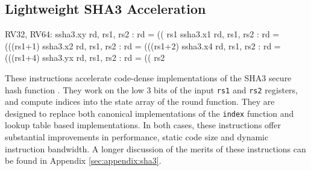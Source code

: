 

\subsection{Lightweight SHA3 Acceleration}
\label{sec:scalar:sha3}

\begin{cryptoisa}
RV32, RV64:
    ssha3.xy rd, rs1, rs2 : rd = (( rs1    %
    ssha3.x1 rd, rs1, rs2 : rd = (((rs1+1) %
    ssha3.x2 rd, rs1, rs2 : rd = (((rs1+2) %
    ssha3.x4 rd, rs1, rs2 : rd = (((rs1+4) %
    ssha3.yx rd, rs1, rs2 : rd = (( rs2    %
\end{cryptoisa}

These instructions accelerate code-dense implementations of the SHA3 secure
hash function \cite{nist:fips:202}.
They work on the low $3$ bits of the input {\tt rs1} and {\tt rs2} registers,
and compute indices into the state array of the round function.
They are designed to replace both canonical implementations of the
{\tt index} function and lookup table based implementations.
In both cases, these instructions offer substantial
improvements in performance, static code size and dynamic instruction
bandwidth.
A longer discussion of the merits of these instructions can
be found in Appendix \ref{sec:appendix:sha3}.




